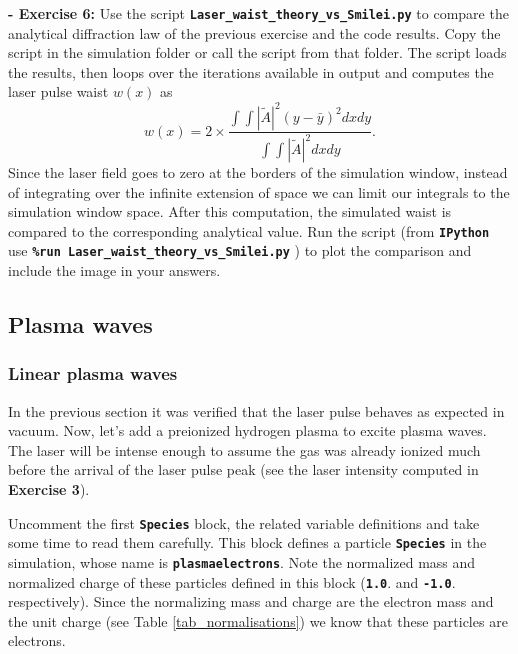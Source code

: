 \documentclass[a4paper,12pt]{extarticle}
\newcommand{\commandline}[1]{\texttt{\textbf{#1}}}
\begin{document}
\textbf{ - Exercise  6:} Use the script \commandline{Laser\_waist\_theory\_vs\_Smilei.py} to compare the analytical diffraction law of the previous exercise and the code results. Copy the script in the simulation folder or call the script from that folder. The script loads the results, then loops over the iterations available in output and computes the laser pulse waist $w(x)$ as 
\begin{equation}
w(x)=2\times\frac{\int\int|\tilde{A}|^2  (y-\bar{y})^2 dx dy}{\int\int |\tilde{A}|^2  dx dy}.
\end{equation} Since the laser field goes to zero at the borders of the simulation window, instead of integrating over the infinite extension of space we can limit our integrals to the simulation window space. After this computation, the simulated waist is compared to the corresponding analytical value. Run the script (from \commandline{IPython} use \commandline{\%run Laser\_waist\_theory\_vs\_Smilei.py} ) to plot the comparison and include the image in your answers.

\subsection{Plasma waves}

\subsubsection{Linear plasma waves}
In the previous section it was verified that the laser pulse behaves as expected in vacuum. Now, let's add a preionized hydrogen plasma to excite plasma waves.
The laser will be intense enough to assume the gas was already ionized much before the arrival of the laser pulse peak (see the laser intensity computed in \textbf{Exercise 3}).

Uncomment the first \commandline{Species} block, the related variable definitions and take some time to read them carefully. This block defines a particle \commandline{Species} in the simulation, whose name is \commandline{plasmaelectrons}. Note the normalized mass and normalized charge of these particles defined in this block (\commandline{1.0}. and \commandline{-1.0}. respectively). Since the normalizing mass and charge are the electron mass and the unit charge (see Table \ref{tab_normalisations}) we know that these particles are electrons.
\end{document}
